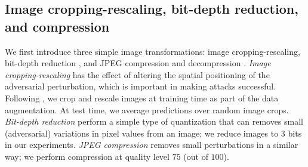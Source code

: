 \subsection{Image cropping-rescaling, bit-depth reduction, and compression}


We first introduce three simple image transformations: image cropping-rescaling, bit-depth reduction \citep{xu2017feature}, and JPEG compression and decompression \citep{dziugaite2016study}. \emph{Image cropping-rescaling} has the effect of altering the spatial positioning of the adversarial perturbation, which is important in making attacks successful. Following \citet{he2016residual}, we crop and rescale images at training time as part of the data augmentation. At test time, we average predictions over random image crops. \emph{Bit-depth reduction} \citep{xu2017feature} perform a simple type of quantization that can removes small (adversarial) variations in pixel values from an image; we reduce images to $3$ bits in our experiments. \emph{JPEG compression} \citep{dziugaite2016study} removes small perturbations in a similar way; we perform compression at quality level $75$ (out of $100$).




